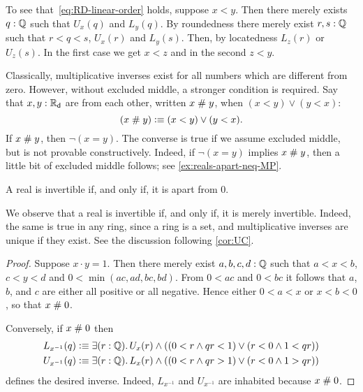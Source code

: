 To see that~\eqref{eq:RD-linear-order} holds, suppose $x < y$. Then there merely exists $q : \mathbb{Q}$ such that $U_x(q)$ and
$L_y(q)$. By roundedness there merely exist $r, s : \mathbb{Q}$ such that $r < q < s$, $U_x(r)$
and $L_y(s)$. Then, by locatedness $L_z(r)$ or $U_z(s)$. In the first case we get $x < z$
and in the second $z < y$. 

Classically, multiplicative inverses exist for all numbers which are different from zero.
However, without excluded middle, a stronger condition is required. Say that $x, y : \mathbb{R}_\mathsf{d}$
are 
%
from each other, written $x \mathrel{\#} y$, when $(x < y) \lor (y < x)$:
%
\begin{equation*}
  (x \mathrel{\#} y) \vcentcolon\equiv (x < y) \lor (y < x).
\end{equation*}
%
If $x \mathrel{\#} y$, then $\lnot (x = y)$.
The converse is true if we assume excluded middle, but is not provable constructively.
%
Indeed, if $\lnot (x = y)$ implies $x\mathrel{\#} y$, then a little bit of excluded middle follows; see \autoref{ex:reals-apart-neq-MP}.

\begin{thm} \label{RD-inverse-apart-0}
  A real is invertible if, and only if, it is apart from $0$.
\end{thm}

\begin{rmk}
  We observe that a real is invertible if, and only if, it is merely
  invertible.  Indeed, the same is true in any ring, since a ring is a set, and
  multiplicative inverses are unique if they exist.  See the discussion
  following \autoref{cor:UC}.
\end{rmk}

\begin{proof}
  Suppose $x \cdot y = 1$. Then there merely exist $a, b, c, d : \mathbb{Q}$ such that
  $a < x < b$, $c < y < d$ and $0 < \min (a c, a d, b c, b d)$. From $0 < a c$ and $0 < b c$ it follows
  that $a$, $b$, and $c$ are either all positive or all negative.
  Hence either $0 < a < x$ or $x < b < 0$, so that $x \mathrel{\#} 0$.

  Conversely, if $x \mathrel{\#} 0$ then
  \begin{align*}
    L_{x^{-1}}(q) &\defeq
    \exis{r : \Q} U_x(r) \land ((0 < r \land q r < 1) \lor (r < 0 \land 1 < q r))
    \\
    U_{x^{-1}}(q) &\defeq
    \exis{r : \Q} L_x(r) \land ((0 < r \land q r > 1) \lor (r < 0 \land 1 > q r))
  \end{align*}
  defines the desired inverse. Indeed, $L_{x^{-1}}$ and $U_{x^{-1}}$ are inhabited because
  $x \mathrel{\#} 0$.
\end{proof}

